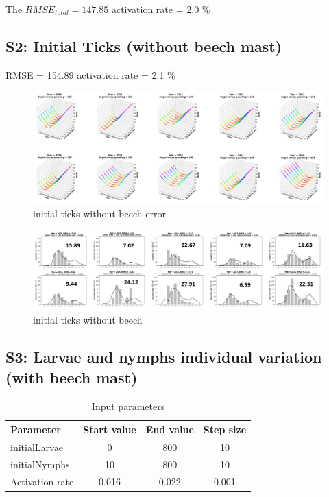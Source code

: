 \documentclass[a4paper, 11pt]{scrartcl}
\begin{document}
The $RMSE_{total} = 147.85$
activation rate = 2.0 \%

\newpage
\subsection{S2: Initial Ticks (without beech mast)}
RMSE = 154.89
activation rate = 2.1 \%

\begin{figure}[h!]
\centering
\includegraphics[width=1.0\textwidth]{figures/initial_ticks_without_beech_error.PNG}
\caption{initial ticks without beech error}
\label{fig:initial_ticks_without_beech_error}
\end{figure}

\begin{figure}[h!]
\centering
\includegraphics[width=1.0\textwidth]{figures/initial_ticks_without_beech.PNG}
\caption{initial ticks without beech}
\label{fig:initial_ticks_without_beech}
\end{figure}



\newpage
\subsection{S3: Larvae and nymphs individual variation (with beech mast)}


\begin{table}[h!]
\caption{Input parameters}
\label{tab:independent_initial_ticks_params}
\begin{tabularx}{\textwidth}{lccc}
\toprule
\textbf{Parameter} 	& \textbf{Start value} & \textbf{End value} & \textbf{Step size} \\
\midrule
initialLarvae   	& 0 		& 800  		& 10 \\
initialNymphs   	& 10   		& 800	 	& 10 \\
Activation rate     & 0.016     & 0.022   	& 0.001 \\
\bottomrule
\end{tabularx}
\end{table}
\end{document}
